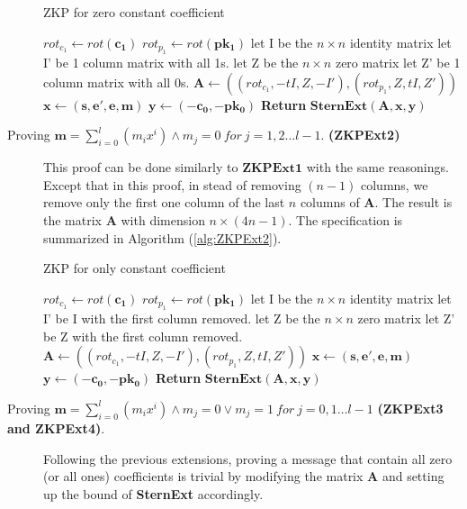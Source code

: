 \begin{description}
  \begin{algorithm}
    \caption{ZKP for zero constant coefficient}\label{alg:ZKPExt1}
    \begin{algorithmic}[1]
      \State $rot_{c_1} \gets rot(\mathbf{c_1})$
      \State $rot_{p_1} \gets rot(\mathbf{pk_1})$
      \State let I be the $n \times n$ identity matrix
      \State let I' be 1 column matrix with all 1s.
      \State let Z be the $n \times n $ zero matrix
      \State let Z' be 1 column matrix with all 0s.
      \State $\mathbf{A} \gets ((rot_{c_1},-tI, Z, -I'),(rot_{p_1}, Z, tI,Z')) $
      \State $\mathbf{x} \gets (\mathbf{s, e', e, m})$
      \State $\mathbf{y} \gets (\mathbf{-c_0, -pk_0})$
      \State \textbf{Return} $\mathbf{SternExt(A,x,y)}$
      \EndProcedure
    \end{algorithmic}
  \end{algorithm}

\item[Proving $\mathbf{m}=\sum_{i = 0}^l(m_ix^i) \land m_j = 0\  for\  j = 1,2
  \dots l-1$. \textbf{(ZKPExt2)}] This proof can be done similarly to $\mathbf{ZKPExt1}$ with
  the same reasonings. Except that in this proof, in stead of removing $(n-1)$ columns, we
  remove only the first one column of the last $n$ columns of $\mathbf{A}$. The result
  is the matrix $\mathbf{A}$ with dimension $n \times (4n-1)$. The specification is summarized in Algorithm (\ref{alg:ZKPExt2}).
  \begin{algorithm}
    \caption{ZKP for only constant coefficient}\label{alg:ZKPExt2}
    \begin{algorithmic}[1]
      \State $rot_{c_1} \gets rot(\mathbf{c_1})$
      \State $rot_{p_1} \gets rot(\mathbf{pk_1})$
      \State let I be the $n \times n$ identity matrix
      \State let I' be I with the first column removed.
      \State let Z be the $n \times n $ zero matrix
      \State let Z' be Z with the first column removed.
      \State $\mathbf{A} \gets ((rot_{c_1},-tI, Z, -I'),(rot_{p_1}, Z, tI,Z')) $
      \State $\mathbf{x} \gets (\mathbf{s, e', e, m})$
      \State $\mathbf{y} \gets (\mathbf{-c_0, -pk_0})$
      \State \textbf{Return} $\mathbf{SternExt(A,x,y)}$
      \EndProcedure
    \end{algorithmic}
  \end{algorithm}


\item[Proving $\mathbf{m}=\sum_{i = 0}^l(m_ix^i) \land m_j = 0 \lor m_j = 1\  for \  j = 0,1
  \dots l-1$ \textbf{(ZKPExt3 and ZKPExt4)}. ] Following the previous extensions, proving a message that
  contain all zero (or all ones) coefficients is trivial by modifying the matrix $\mathbf{A}$ and setting up the bound of
  \textbf{SternExt}
  accordingly.
\end{description}

